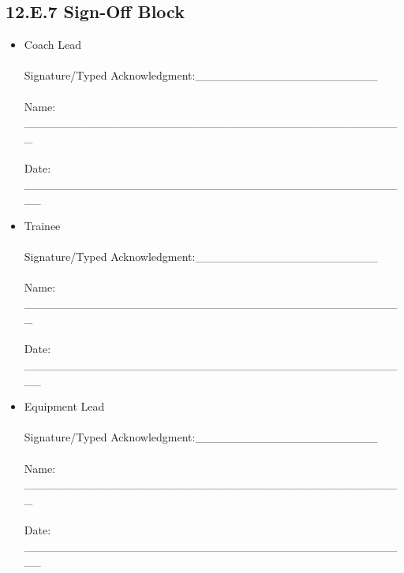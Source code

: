 \documentclass[10pt]{article}
\begin{document}
\endgroup

\newpage

\subsection*{12.E.7 Sign-Off Block}
{}

\begin{itemize}
\item  
Coach Lead \\\\Signature/Typed Acknowledgment:\_\_\_\_\_\_\_\_\_\_\_\_\_\_\_\_\_\_\_\_\_\_\\\\Name: \_\_\_\_\_\_\_\_\_\_\_\_\_\_\_\_\_\_\_\_\_\_\_\_\_\_\_\_\_\_\_\_\_\_\_\_\_\_\_\_\_\_\_\_\_\_   \\\\Date: \_\_\_\_\_\_\_\_\_\_\_\_\_\_\_\_\_\_\_\_\_\_\_\_\_\_\_\_\_\_\_\_\_\_\_\_\_\_\_\_\_\_\_\_\_\_\_ 
\item Trainee \\\\Signature/Typed Acknowledgment:\_\_\_\_\_\_\_\_\_\_\_\_\_\_\_\_\_\_\_\_\_\_\\\\Name: \_\_\_\_\_\_\_\_\_\_\_\_\_\_\_\_\_\_\_\_\_\_\_\_\_\_\_\_\_\_\_\_\_\_\_\_\_\_\_\_\_\_\_\_\_\_   \\\\Date: \_\_\_\_\_\_\_\_\_\_\_\_\_\_\_\_\_\_\_\_\_\_\_\_\_\_\_\_\_\_\_\_\_\_\_\_\_\_\_\_\_\_\_\_\_\_\_ 
\item Equipment Lead \\\\Signature/Typed Acknowledgment:\_\_\_\_\_\_\_\_\_\_\_\_\_\_\_\_\_\_\_\_\_\_\\\\Name: \_\_\_\_\_\_\_\_\_\_\_\_\_\_\_\_\_\_\_\_\_\_\_\_\_\_\_\_\_\_\_\_\_\_\_\_\_\_\_\_\_\_\_\_\_\_   \\\\Date: \_\_\_\_\_\_\_\_\_\_\_\_\_\_\_\_\_\_\_\_\_\_\_\_\_\_\_\_\_\_\_\_\_\_\_\_\_\_\_\_\_\_\_\_\_\_\_ 
\end{itemize}
\end{document}
